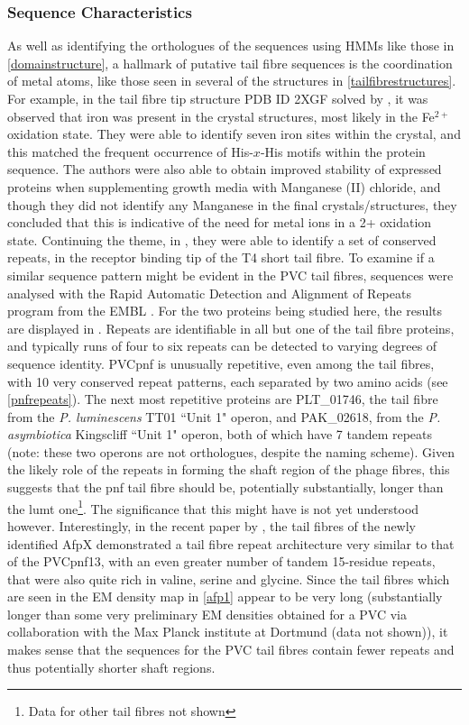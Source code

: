 \subsubsection{Sequence Characteristics}
As well as identifying the orthologues of the sequences using HMMs like those in \vref{domainstructure}, a hallmark of putative tail fibre sequences is the coordination of metal atoms, like those seen in several of the structures in \vref{tailfibrestructures}. For example, in the tail fibre tip structure PDB ID 2XGF solved by \cite{Bartual2010}, it was observed that iron was present in the crystal structures, most likely in the Fe$^{2+}$ oxidation state. They were able to identify seven iron sites within the crystal, and this matched the frequent occurrence of His-$x$-His motifs within the protein sequence. The authors were also able to obtain improved stability of expressed proteins when supplementing growth media with Manganese (II) chloride, and though they did not identify any Manganese in the final crystals/structures, they concluded that this is indicative of the need for metal ions in a 2+ oxidation state. Continuing the theme, in \cite{VanRaaij2001}, they were able to identify a set of conserved repeats, in the receptor binding tip of the T4 short tail fibre. To examine if a similar sequence pattern might be evident in the PVC tail fibres, sequences were analysed with the Rapid Automatic Detection and Alignment of Repeats program from the EMBL \citep{Heger2000}. For the two proteins being studied here, the results are displayed in . Repeats are identifiable in all but one of the tail fibre proteins, and typically runs of four to six repeats can be detected to varying degrees of sequence identity. PVCpnf is unusually repetitive, even among the tail fibres, with 10 very conserved repeat patterns, each separated by two amino acids (see \vref{pnfrepeats}). The next most repetitive proteins are PLT\_01746, the tail fibre from the \emph{P. luminescens} TT01 ``Unit 1" operon, and PAK\_02618, from the \emph{P. asymbiotica} Kingscliff ``Unit 1" operon, both of which have 7 tandem repeats (note: these two operons are not orthologues, despite the naming scheme). Given the likely role of the repeats in forming the shaft region of the phage fibres, this suggests that the pnf tail fibre should be, potentially substantially, longer than the lumt one\footnote{Data for other tail fibres not shown}. The significance that this might have is not yet understood however. Interestingly, in the recent paper by \cite{Hurst2018}, the tail fibres of the newly identified AfpX demonstrated a tail fibre repeat architecture very similar to that of the PVCpnf13, with an even greater number of tandem 15-residue repeats, that were also quite rich in valine, serine and glycine. Since the tail fibres which are seen in the EM density map in \vref{afp1} appear to be very long (substantially longer than some very preliminary EM densities obtained for a PVC via collaboration with the Max Planck institute at Dortmund (data not shown)), it makes sense that the sequences for the PVC tail fibres contain fewer repeats and thus potentially shorter shaft regions.

